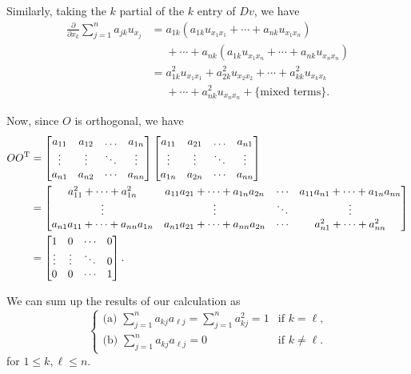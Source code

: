 \begin{solution*}
  Similarly, taking the \(k\) partial of the \(k\)
  entry of \(Dv\), we have
  \begin{equation}
    \label{eq:5:laplacian-k-part}
    \begin{aligned}
      \frac{\partial}{\partial x_k}\sum_{j=1}^n a_{jk}u_{x_j}
      &=a_{1k}(a_{1k}u_{x_1x_1}+\dotsb+a_{nk}u_{x_1x_n})\\
      &\phantom{{}={}}+\dotsb+a_{nk}
      (a_{1k}u_{x_1x_n}+\dotsb+a_{nk}u_{x_nx_n})\\
      &=a_{1k}^2u_{x_1x_1}+a_{2k}^2u_{x_2x_2}+\dotsb+a_{kk}^2u_{x_kx_k}\\
      &\phantom{{}={}}+\dotsb+a_{nk}^2u_{x_nx_n}+\{\text{mixed terms}\}.
    \end{aligned}
  \end{equation}

  Now, since \(O\) is orthogonal, we have
  \begin{align*}
    OO^\rmT
    &=%
    \begin{bmatrix}
      a_{11}&a_{12}&\dotsc&a_{1n}\\
      \vdots&\vdots&\ddots&\vdots\\
      a_{n1}&a_{n2}&\cdots&a_{nn}
    \end{bmatrix}
    \begin{bmatrix}
      a_{11}&a_{21}&\dotsc&a_{n1}\\
      \vdots&\vdots&\ddots&\vdots\\
      a_{1n}&a_{2n}&\cdots&a_{nn}
    \end{bmatrix}
    \\
    &=%
      \begin{bmatrix}
        a_{11}^2+\dotsb+a_{1n}^2&a_{11}a_{21}+\dotsb+a_{1n}a_{2n}
        &\cdots&a_{11}a_{n1}+\dotsb+a_{1n}a_{nn}\\
        \vdots&\vdots&\ddots&\vdots\\
        a_{n1}a_{11}+\dotsb+a_{nn}a_{1n}&a_{n1}a_{21}+\dotsb+a_{nn}a_{2n}
        &\cdots&a_{n1}^2+\dotsb+a_{nn}^2
      \end{bmatrix}\\
    &=\begin{bmatrix}
      1&0&\cdots&0\\
      \vdots&\vdots&\ddots&0\\
      0&0&\cdots&1
      \end{bmatrix}.
  \end{align*}

  We can sum up the results of our calculation as
  \begin{equation}
    \label{eq:5:ortho-matrix}
    \begin{cases}
    \text{(a) }\sum_{j=1}^na_{kj}a_{\ell j}=\sum_{j=1}^na_{kj}^2=1&\text{if \(k=\ell\),}\\
    \text{(b) }\sum_{j=1}^na_{kj}a_{\ell j}=0&\text{if \(k\neq\ell\).}
    \end{cases}
  \end{equation}
  for \(1\leq k,\ell\leq n\).


\end{solution*}
